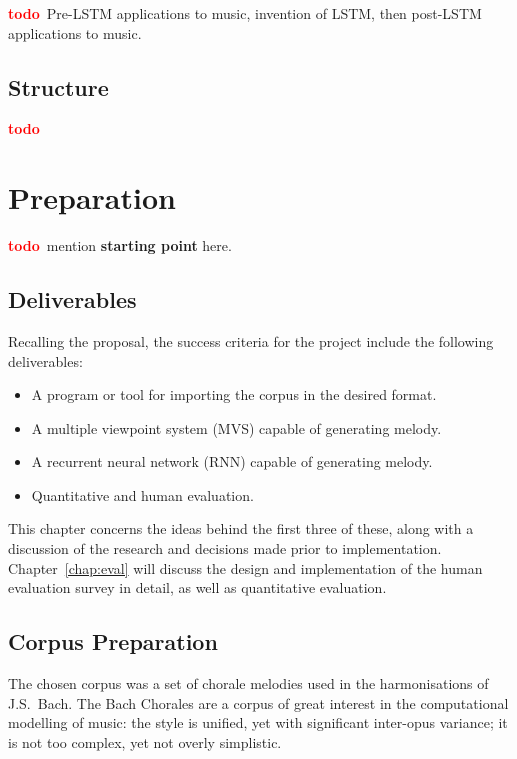 \documentclass[12pt,a4paper,twoside,openright]{report}
\newcommand{\todo}{\textcolor{red}{\textbf{todo}~}}
\begin{document}
\todo Pre-LSTM applications to music, invention of LSTM, then post-LSTM
applications to music.

\section{Structure}

\todo

\chapter{Preparation}

\todo mention \textbf{starting point} here.

\section{Deliverables}

Recalling the proposal, the success criteria for the project include the
following deliverables:
\begin{itemize}
  \item A program or tool for importing the corpus in the desired format.
  \item A multiple viewpoint system (MVS) capable of generating melody.
  \item A recurrent neural network (RNN) capable of generating melody.
  \item Quantitative and human evaluation.
\end{itemize}

This chapter concerns the ideas behind the first three of these, along with
a discussion of the research and decisions made prior to implementation.
Chapter~\ref{chap:eval} will discuss the design and implementation of the
human evaluation survey in detail, as well as quantitative evaluation.

\section{Corpus Preparation}

The chosen corpus was a set of chorale melodies used in the harmonisations of
J.S.\ Bach. The Bach Chorales are a corpus of great interest in the
computational modelling of music: the style is unified, yet with significant
inter-opus variance; it is not too complex, yet not overly simplistic.
\end{document}
